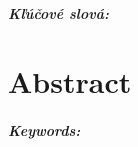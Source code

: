 \documentclass[12pt, oneside]{book}
\begin{document}

\paragraph*{Kľúčové slová:} %


\newpage 
\chapter*{Abstract}



\paragraph*{Keywords:} 


%
%



\newpage 

\tableofcontents



\newpage 

\listoffigures
\listoftables


\mainmatter
\end{document}

